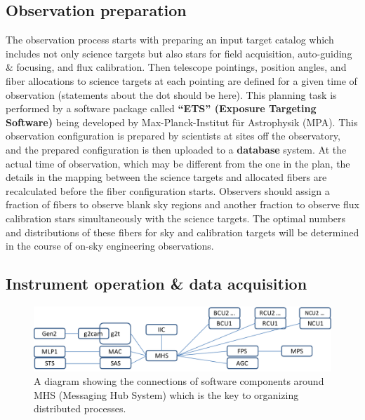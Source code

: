 \documentclass[a4paper]{article}
\begin{document}
\subsection{Observation preparation\label{sec:operation_concept:preparation}}

The observation process starts with preparing an input target catalog
which includes not only science targets but also stars for field
acquisition, auto-guiding \& focusing, and flux calibration.  Then
telescope pointings, position angles, and fiber allocations to science
targets at each pointing are defined for a given time of observation
(statements about the dot should be here). This planning task is
performed by a software package called {\bf ``ETS'' (Exposure
  Targeting Software)} being developed by Max-Planck-Institut f\"{u}r
Astrophysik (MPA). This observation configuration is prepared by
scientists at sites off the observatory, and the prepared
configuration is then uploaded to a {\bf database} system. At the
actual time of observation, which may be different from the one in the
plan, the details in the mapping between the science targets and
allocated fibers are recalculated before the fiber configuration
starts. Observers should assign a fraction of fibers to observe blank
sky regions and another fraction to observe flux calibration stars
simultaneously with the science targets. The optimal numbers and
distributions of these fibers for sky and calibration targets will be
determined in the course of on-sky engineering observations.

\subsection{Instrument operation \& data acquisition\label{sec:operation_concept:instrument}}

\begin{figure}[!htb]
\begin{center}
\includegraphics[scale=0.5]{./figures/software_connections.pdf}
\end{center}
\caption{A diagram showing the connections of software components
  around MHS (Messaging Hub System) which is the key to organizing
  distributed processes. \label{fig:pfs_software_connections}}
\end{figure}
\end{document}
